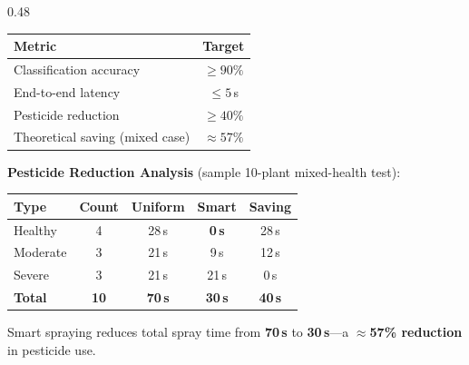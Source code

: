 \documentclass[final,t]{beamer}
\newcommand{\hlbad}[1]{\textbf{\textcolor{RedBad}{#1}}}
\newcommand{\hlgood}[1]{\textbf{\textcolor{GreenGood}{#1}}}
\begin{document}
\begin{frame}[t]{}
\begin{columns}[T]
\begin{column}{0.48\textwidth}
\begin{posterbox}[title=7~~Expected Performance \& Pesticide Saving]
\begin{resultbox}
\renewcommand{\arraystretch}{1.25}
\centering
\begin{tabular}{l c}
\toprule
\textbf{Metric} & \textbf{Target} \\
\midrule
\rowcolor{SectionBG}
Classification accuracy & $\geq 90\%$ \\
End-to-end latency & $\leq 5$\,s \\
\rowcolor{SectionBG}
Pesticide reduction & $\geq 40\%$ \\
Theoretical saving (mixed case) & $\approx 57\%$ \\
\bottomrule
\end{tabular}
\end{resultbox}

\vspace{0.3em}
\textbf{Pesticide Reduction Analysis} (sample 10-plant mixed-health test):

\vspace{0.3em}
\begin{resultbox}
\renewcommand{\arraystretch}{1.2}
\centering
\begin{tabular}{l c c c c}
\toprule
\textbf{Type} & \textbf{Count} & \textbf{Uniform} & \textbf{Smart} & \textbf{Saving} \\
\midrule
Healthy  & 4 & 28\,s & \hlgood{0\,s}  & 28\,s \\
Moderate & 3 & 21\,s & 9\,s           & 12\,s \\
Severe   & 3 & 21\,s & 21\,s          & 0\,s  \\
\midrule
\textbf{Total} & \textbf{10} & \textbf{70\,s} & \hlgood{\textbf{30\,s}} & \hlgood{\textbf{40\,s}} \\
\bottomrule
\end{tabular}
\end{resultbox}

\vspace{0.3em}
Smart spraying reduces total spray time from \hlbad{70\,s} to
\hlgood{30\,s}---a \hlgood{$\approx$57\% reduction} in pesticide use.
\end{posterbox}

\vspace{0.4cm}


\end{column}
\end{columns}
\end{frame}
\end{document}
